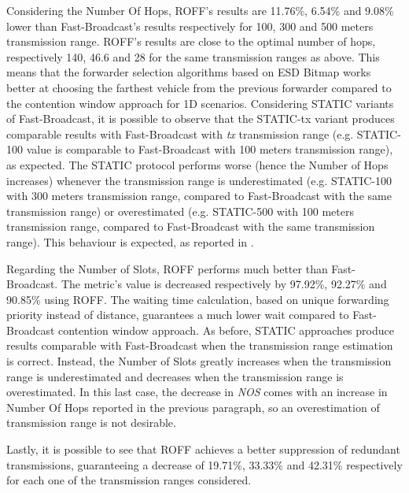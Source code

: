 		
		Considering the Number Of Hops, ROFF's results are 11.76\%, 6.54\% and 9.08\% lower than Fast-Broadcast's results respectively for 100, 300 and 500 meters transmission range. ROFF's results are close to the optimal number of hops, respectively 140, 46.6 and 28 for the same transmission ranges as above. This means that the forwarder selection algorithms based on ESD Bitmap works better at choosing the farthest vehicle from the previous forwarder compared to the contention window approach for 1D scenarios. Considering STATIC variants of Fast-Broadcast, it is possible to observe that the STATIC-tx variant produces comparable results with Fast-Broadcast with \textit{tx} transmission range (e.g. STATIC-100 value is comparable to Fast-Broadcast with 100 meters transmission range), as expected. The STATIC protocol performs worse (hence the Number of Hops increases) whenever the transmission range is underestimated (e.g. STATIC-100 with 300 meters transmission range, compared to Fast-Broadcast with the same transmission range) or overestimated (e.g. STATIC-500 with 100 meters transmission range, compared to Fast-Broadcast with the same transmission range). This behaviour is expected, as reported in \cite{BAR2017}.
		
		
		Regarding the Number of Slots, ROFF performs much better than Fast-Broadcast. The metric's value is decreased respectively by 97.92\%, 92.27\% and 90.85\% using ROFF. The waiting time calculation, based on unique forwarding priority instead of distance, guarantees a much lower wait compared to Fast-Broadcast contention window approach. As before, STATIC approaches produce results comparable with Fast-Broadcast when the transmission range estimation is correct. Instead, the Number of Slots greatly increases when the transmission range is underestimated and decreases when the transmission range is overestimated. In this last case, the decrease in \textit{NOS} comes with an increase in Number Of Hops reported in the previous paragraph, so an overestimation of transmission range is not desirable.
		
		
		Lastly, it is possible to see that ROFF achieves a better suppression of redundant transmissions, guaranteeing a decrease of 19.71\%, 33.33\% and 42.31\% respectively for each one of the transmission ranges considered.
		
		
